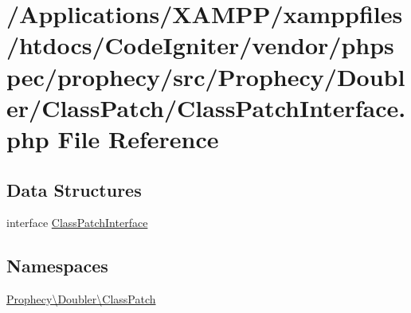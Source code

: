 \hypertarget{_class_patch_interface_8php}{}\section{/\+Applications/\+X\+A\+M\+P\+P/xamppfiles/htdocs/\+Code\+Igniter/vendor/phpspec/prophecy/src/\+Prophecy/\+Doubler/\+Class\+Patch/\+Class\+Patch\+Interface.php File Reference}
\label{_class_patch_interface_8php}
\subsection*{Data Structures}
\begin{DoxyCompactItemize}
\item 
interface \mbox{\hyperlink{interface_prophecy_1_1_doubler_1_1_class_patch_1_1_class_patch_interface}{Class\+Patch\+Interface}}
\end{DoxyCompactItemize}
\subsection*{Namespaces}
\begin{DoxyCompactItemize}
\item 
 \mbox{\hyperlink{namespace_prophecy_1_1_doubler_1_1_class_patch}{Prophecy\textbackslash{}\+Doubler\textbackslash{}\+Class\+Patch}}
\end{DoxyCompactItemize}
